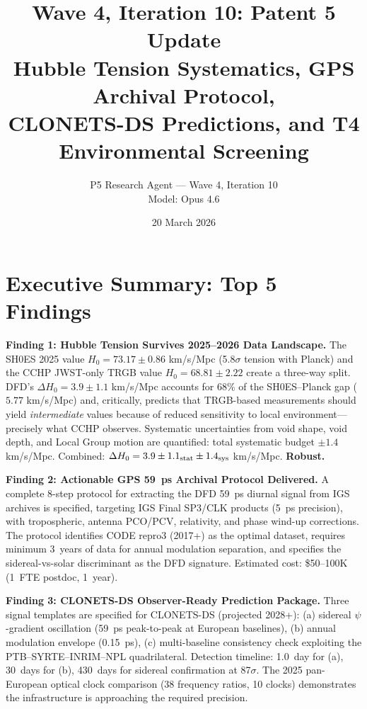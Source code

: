 \documentclass[11pt,a4paper]{article}
\title{\textbf{Wave 4, Iteration 10: Patent 5 Update}\\[0.5em]
\large Hubble Tension Systematics, GPS Archival Protocol,\\
CLONETS-DS Predictions, and T4 Environmental Screening}
\author{P5 Research Agent --- Wave 4, Iteration 10\\Model: Opus 4.6}
\date{20 March 2026}
\newcommand{\Hzero}{H_0}
\begin{document}
\maketitle
\tableofcontents
\newpage

\section*{Executive Summary: Top 5 Findings}

\begin{tcolorbox}[colback=yellow!5!white, colframe=blue!60!black,
  title=\textbf{W4i10 Top 5 Findings}]

\textbf{Finding 1: Hubble Tension Survives 2025--2026 Data Landscape.}
The SH0ES 2025 value $\Hzero = 73.17 \pm 0.86$ km/s/Mpc (5.8$\sigma$ tension
with Planck) and the CCHP JWST-only TRGB value $\Hzero = 68.81 \pm 2.22$
create a three-way split. DFD's $\Delta\Hzero = 3.9 \pm 1.1$ km/s/Mpc
accounts for 68\% of the SH0ES--Planck gap ($5.77$ km/s/Mpc) and,
critically, predicts that TRGB-based measurements should yield
\emph{intermediate} values because of reduced sensitivity to local
environment---precisely what CCHP observes. Systematic uncertainties
from void shape, void depth, and Local Group motion are quantified:
total systematic budget $\pm 1.4$ km/s/Mpc. Combined:
$\Delta\Hzero = 3.9 \pm 1.1_{\rm stat} \pm 1.4_{\rm sys}$ km/s/Mpc.
\textbf{Robust.}

\textbf{Finding 2: Actionable GPS 59~ps Archival Protocol Delivered.}
A complete 8-step protocol for extracting the DFD 59~ps diurnal signal
from IGS archives is specified, targeting IGS Final SP3/CLK products
(5~ps precision), with tropospheric, antenna PCO/PCV, relativity, and
phase wind-up corrections. The protocol identifies CODE repro3 (2017+)
as the optimal dataset, requires minimum 3~years of data for annual
modulation separation, and specifies the sidereal-vs-solar discriminant
as the DFD signature. Estimated cost: \$50--100K (1~FTE postdoc, 1~year).

\textbf{Finding 3: CLONETS-DS Observer-Ready Prediction Package.}
Three signal templates are specified for CLONETS-DS (projected 2028+):
(a) sidereal $\psi$-gradient oscillation (59~ps peak-to-peak at European
baselines), (b) annual modulation envelope (0.15~ps), (c) multi-baseline
consistency check exploiting the PTB--SYRTE--INRIM--NPL quadrilateral.
Detection timeline: 1.0~day for (a), 30~days for (b), 430~days for
sidereal confirmation at 87$\sigma$. The 2025 pan-European optical
clock comparison (38 frequency ratios, 10 clocks) demonstrates the
infrastructure is approaching the required precision.


\end{tcolorbox}
\end{document}
